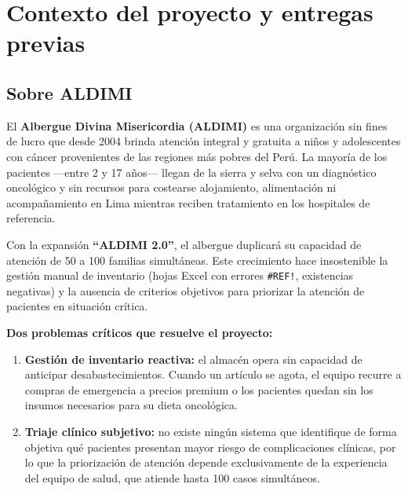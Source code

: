 \documentclass[12pt, a4paper]{article}
\begin{document}
\section{Contexto del proyecto y entregas previas}

\subsection{Sobre ALDIMI}

El \textbf{Albergue Divina Misericordia (ALDIMI)} es una organizaci\'on sin fines de lucro que desde 2004 brinda atenci\'on integral y gratuita a ni\~nos y adolescentes con c\'ancer provenientes de las regiones m\'as pobres del Per\'u. La mayor\'ia de los pacientes ---entre 2 y 17 a\~nos--- llegan de la sierra y selva con un diagn\'ostico oncol\'ogico y sin recursos para costearse alojamiento, alimentaci\'on ni acompa\~namiento en Lima mientras reciben tratamiento en los hospitales de referencia.

Con la expansi\'on \textbf{``ALDIMI 2.0''}, el albergue duplicar\'a su capacidad de atenci\'on de 50 a 100 familias simult\'aneas. Este crecimiento hace insostenible la gesti\'on manual de inventario (hojas Excel con errores \texttt{\#REF!}, existencias negativas) y la ausencia de criterios objetivos para priorizar la atenci\'on de pacientes en situaci\'on cr\'itica.

\begin{infobox}
\textbf{Dos problemas cr\'iticos que resuelve el proyecto:}
\begin{enumerate}[leftmargin=1.8em, itemsep=4pt]
  \item \textbf{Gesti\'on de inventario reactiva:} el almac\'en opera sin capacidad de anticipar desabastecimientos. Cuando un art\'iculo se agota, el equipo recurre a compras de emergencia a precios premium o los pacientes quedan sin los insumos necesarios para su dieta oncol\'ogica.
  \item \textbf{Triaje cl\'inico subjetivo:} no existe ning\'un sistema que identifique de forma objetiva qu\'e pacientes presentan mayor riesgo de complicaciones cl\'inicas, por lo que la priorizaci\'on de atenci\'on depende exclusivamente de la experiencia del equipo de salud, que atiende hasta 100 casos simult\'aneos.
\end{enumerate}
\end{infobox}
\end{document}
